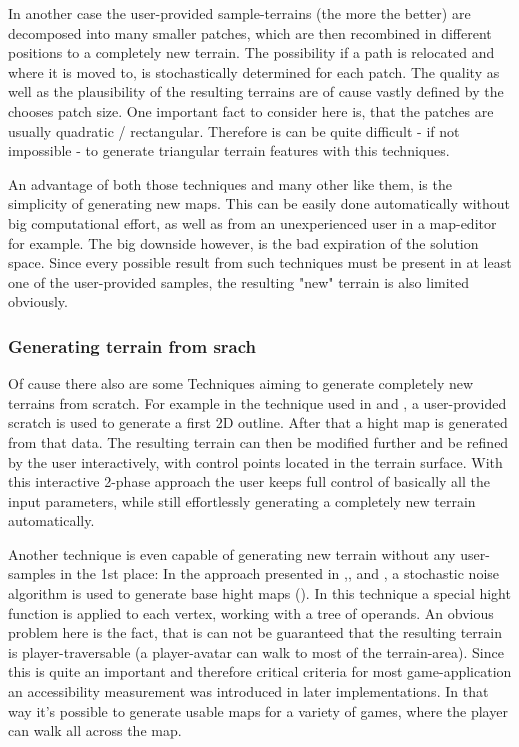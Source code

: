 In another case \cite{raffe2011evolving} the user-provided sample-terrains (the more the better) are decomposed into many smaller patches, which are then recombined in different positions to a completely new terrain. The possibility if a path is relocated and where it is moved to, is stochastically determined for each patch. The quality as well as the plausibility of the resulting terrains are of cause vastly defined by the chooses patch size. One important fact to consider here is, that the patches are usually quadratic / rectangular. Therefore is can be quite difficult - if not impossible - to generate triangular terrain features with this techniques.

An advantage of both those techniques and many other like them, is the simplicity of generating new maps. This can be easily done automatically without big computational effort, as well as from an unexperienced user in a map-editor for example. The big downside however, is the bad expiration of the solution space. Since every possible result from such techniques must be present in at least one of the user-provided samples, the resulting "new" terrain is also limited obviously.

\subsubsection{Generating terrain from srach}
Of cause there also are some Techniques aiming to generate completely new terrains from scratch. For example in the technique used in \cite{ong2005terrain} and \cite{saunders2006realistic}, a user-provided scratch is used to generate a first 2D outline. After that a hight map is generated from that data. The resulting terrain can then be modified further and be refined by the user interactively, with control points located in the terrain surface. With this interactive 2-phase approach the user keeps full control of basically all the input parameters, while still effortlessly generating a completely new terrain automatically.

Another technique is even capable of generating new terrain without any user-samples in the 1st place: In the approach presented in \cite{frade2009breeding},\cite{frade2010evolution1},\cite{frade2010evolution2} and \cite{rodrigues2010development}, a stochastic noise algorithm is used to generate base hight maps (). In this technique a special hight function is applied to each vertex, working with a tree of operands. An obvious problem here is the fact, that is can not be guaranteed that the resulting terrain is player-traversable (a player-avatar can walk to most of the terrain-area). Since this is quite an important and therefore critical criteria for most game-application an accessibility measurement was introduced in later implementations. In that way it's possible to generate usable maps for a variety of games, where the player can walk all across the map.

